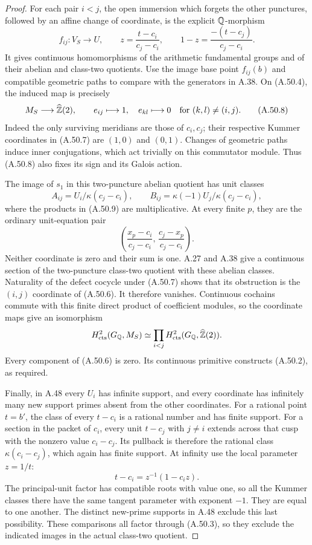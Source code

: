 \begin{proof}
For each pair $i<j$, the open immersion which forgets the
other punctures, followed by an affine change of coordinate,
is the explicit $\mathbb Q$-morphism
\[
 f_{ij}:V_S\longrightarrow U,\qquad
 z=\frac{t-c_i}{c_j-c_i},\qquad
 1-z=\frac{-(t-c_j)}{c_j-c_i}.
\tag{A.50.7}
\]
It gives continuous homomorphisms of the arithmetic fundamental
groups and of their abelian and class-two quotients.  Use the
image base point $f_{ij}(b)$ and compatible geometric paths
to compare with the generators in A.38.  On (A.50.4), the
induced map is precisely
\[
 M_S\longrightarrow\widehat{\mathbb Z}(2),\qquad
          e_{ij}\longmapsto1,\quad e_{kl}\longmapsto0
                          \quad\text{for }(k,l)\ne(i,j).
\tag{A.50.8}
\]
Indeed the only surviving meridians are those of $c_i,c_j$;
their respective Kummer coordinates in (A.50.7) are $(1,0)$
and $(0,1)$.  Changes of geometric paths induce inner
conjugations, which act trivially on this commutator module.
Thus (A.50.8) also fixes its sign and its Galois action.

The image of $s_1$ in this two-puncture abelian quotient has
unit classes
\[
 A_{ij}=U_i/\kappa(c_j-c_i),\qquad
 B_{ij}=\kappa(-1)U_j/\kappa(c_j-c_i),
\tag{A.50.9}
\]
where the products in (A.50.9) are multiplicative.  At every
finite $p$, they are the ordinary unit-equation pair
\[
 \left(\frac{x_p-c_i}{c_j-c_i},\,
       \frac{c_j-x_p}{c_j-c_i}\right).
\]
Neither coordinate is zero and their sum is one.  A.27 and
A.38 give a continuous section of the two-puncture class-two
quotient with these abelian classes.  Naturality of the defect
cocycle under (A.50.7) shows that its obstruction is the
$(i,j)$ coordinate of (A.50.6).  It therefore vanishes.
Continuous cochains commute with this finite direct product
of coefficient modules, so the coordinate maps give an
isomorphism
\[
 H^2_{\rm cts}(G_\mathbb Q,M_S)
       \simeq\prod_{i<j}H^2_{\rm cts}
                        (G_\mathbb Q,\widehat{\mathbb Z}(2)).
\]
Every component of (A.50.6) is zero.  Its continuous primitive
constructs (A.50.2), as required.

Finally, in A.48 every $U_i$ has infinite support, and every
coordinate has infinitely many new support primes absent from
the other coordinates.  For a rational point $t=b'$, the
class of every $t-c_i$ is a rational number and has finite
support.  For a section in the packet of $c_i$, every unit
$t-c_j$ with $j\ne i$ extends across that cusp with the
nonzero value $c_i-c_j$.  Its pullback is therefore the
rational class $\kappa(c_i-c_j)$, which again has finite
support.  At infinity use the local parameter $z=1/t$:
\[
                      t-c_i=z^{-1}(1-c_i z).
\]
The principal-unit factor has compatible roots with value
one, so all the Kummer classes there have the same tangent
parameter with exponent $-1$.  They are equal to one another.
The distinct new-prime supports in A.48 exclude this last
possibility.  These comparisons all factor through
(A.50.3), so they exclude the indicated images in the actual
class-two quotient.
\end{proof}

